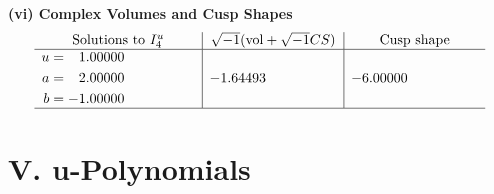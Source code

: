 \documentclass[1p]{elsarticle_modified}
\theoremstyle{definition}
\newcommand{\I}{\sqrt{-1}}
\begin{document}
\newpage\flushleft \textbf{(vi) Complex Volumes and Cusp Shapes}
$$\begin{array}{c|c|c}  
\text{Solutions to }I^u_{4}& \I (\text{vol} + \sqrt{-1}CS) & \text{Cusp shape}\\
 \hline 
\begin{aligned}
u &= \phantom{-}1.00000\phantom{ +0.000000I} \\
a &= \phantom{-}2.00000\phantom{ +0.000000I} \\
b &= -1.00000\phantom{ +0.000000I}\end{aligned}
 & -1.64493\phantom{ +0.000000I} & -6.00000\phantom{ +0.000000I}\\
 \hline 
 \end{array}$$\newpage
\newpage\renewcommand{\arraystretch}{1}
\centering \section*{ V. u-Polynomials}
\end{document}
